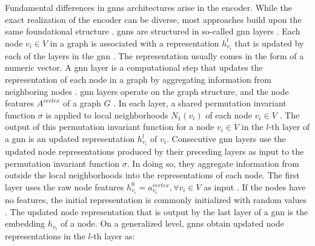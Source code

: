 Fundamental differences in \glspl{gnn} architectures arise in the encoder. While the exact realization of the encoder can be diverse, most approaches build upon the same foundational structure \cite{bronstein_geometric_2021}. \glspl{gnn} are structured in so-called \gls{gnn} layers \cite{bronstein_geometric_2021, wu_comprehensive_2021, zhou_graph_2020}. Each node $v_i \in V$ in a graph is associated with a representation $h_{v_i}^l$ that is updated by each of the layers in the \gls{gnn} \cite{bronstein_geometric_2021}. The representation usually comes in the form of a numeric vector. A \gls{gnn} layer is a computational step that updates the representation of each node in a graph by aggregating information from neighboring nodes \cite{wu_comprehensive_2021}. 
\gls{gnn} layers operate on the graph structure, and the node features $A^{vertex}$ of a graph $G$ \cite{bronstein_geometric_2021}. In each layer, a shared permutation invariant function $\sigma$ is applied to local neighborhoods $N_1(v_i)$ of each node $v_i \in V$ \cite{bronstein_geometric_2021}. The output of this permutation invariant function for a node $v_i \in V$ in the $l$-th layer of a \gls{gnn} is an updated representation $h_{v_i}^l$ of $v_i$. Consecutive \gls{gnn} layers use the updated node representations produced by their preceding layers as input to the permutation invariant function $\sigma$. In doing so, they aggregate information from outside the local neighborhoods into the representations of each node. The first layer uses the raw node features $h_{v_i}^0 = a^{vertex}_{v_i}, \forall v_i \in V$ as input \cite{hamilton_representation_2017}. If the nodes have no features, the initial representation is commonly initialized with random values \cite{wu_comprehensive_2021}. The updated node representation that is output by the last layer of a \gls{gnn} is the embedding $h_{v_i}$ of a node. On a generalized level, \glspl{gnn} obtain updated node representations in the $l$-th layer as:



